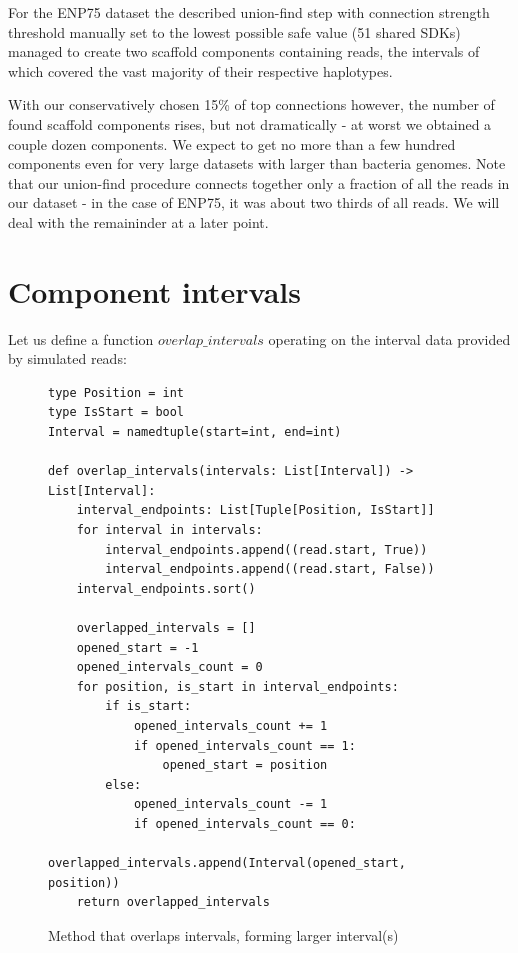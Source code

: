 For the ENP75 dataset the described union-find step with connection strength threshold manually set to the lowest possible safe value (51 shared SDKs) managed to create two scaffold components containing reads, the intervals of which covered the vast majority of their respective haplotypes. 

With our conservatively chosen 15\% of top connections however, the number of found scaffold components rises, but not dramatically - at worst we obtained a couple dozen components. We expect to get no more than a few hundred components even for very large datasets with larger than bacteria genomes. Note that our union-find procedure connects together only a fraction of all the reads in our dataset - in the case of ENP75, it was about two thirds of all reads. We will deal with the remaininder at a later point.

\section{Component intervals}

Let us define a function $overlap\_intervals$ operating on the interval data provided by simulated reads:

\begin{figure}[H]
\lstset{language=Python}
\begin{lstlisting}[basicstyle=\small]
type Position = int
type IsStart = bool
Interval = namedtuple(start=int, end=int)

def overlap_intervals(intervals: List[Interval]) -> List[Interval]:
    interval_endpoints: List[Tuple[Position, IsStart]]
    for interval in intervals:
        interval_endpoints.append((read.start, True))
        interval_endpoints.append((read.start, False))
    interval_endpoints.sort()

    overlapped_intervals = []
    opened_start = -1
    opened_intervals_count = 0
    for position, is_start in interval_endpoints:
        if is_start:
            opened_intervals_count += 1
            if opened_intervals_count == 1:
                opened_start = position
        else:
            opened_intervals_count -= 1
            if opened_intervals_count == 0:
                overlapped_intervals.append(Interval(opened_start, position))
    return overlapped_intervals

\end{lstlisting}
\caption{Method that overlaps intervals, forming larger interval(s)}
\label{fig:overlap_method}
\end{figure}

